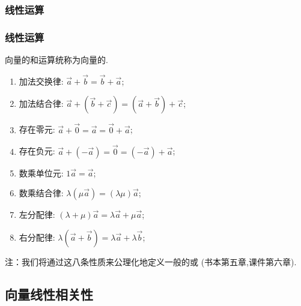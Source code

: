 \subsubsection{线性运算}
\begin{frame}\frametitle{线性运算}
\begin{definition}[线性运算]
向量的和运算统称为向量的.
\end{definition}
\pp
\begin{proposition}[向量线性运算的八条基本性质]
\begin{enumerate}
\item 加法交换律: $\vec{a}+\vec{b}=\vec{b}+\vec{a}$;
\item 加法结合律: $\vec{a}+(\vec{b}+\vec{c})=(\vec{a}+\vec{b})+\vec{c}$;
\item 存在零元: $\vec{a}+\vec{0}=\vec{a}=\vec{0}+\vec{a}$;
\item 存在负元: $\vec{a}+(-\vec{a})=\vec{0}=(-\vec{a})+\vec{a}$;
\item 数乘单位元: $1\vec{a} = \vec{a}$;
\item 数乘结合律: $\lambda(\mu \vec{a})=(\lambda \mu)\vec{a}$;
\item 左分配律: $(\lambda+\mu)\vec{a}=\lambda \vec{a} + \mu \vec{a}$;
\item 右分配律: $\lambda (\vec{a}+\vec{b}) =\lambda \vec{a} + \lambda \vec{b}$;
\end{enumerate}
\end{proposition}
\pp
注：我们将通过这八条性质来公理化地定义一般的或 (书本第五章,课件第六章).
\end{frame}





\subsection{向量线性相关性}





